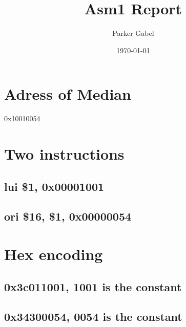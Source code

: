 \documentclass[11pt]{article}
\author{Parker Gabel}
\date{\today}
\title{Asm1 Report}
\begin{document}
\maketitle

\section{Adress of Median}
\label{sec:orgc600dbe}
0x10010054
\section{Two instructions}
\label{sec:orgb352cd8}
\subsection{lui \$1, 0x00001001}
\label{sec:orgc102f80}
\subsection{ori \$16, \$1, 0x00000054}
\label{sec:org4db6459}
\section{Hex encoding}
\label{sec:org851f2cf}
\subsection{0x3c011001, 1001 is the constant}
\label{sec:org54386ab}
\subsection{0x34300054, 0054 is the constant}
\label{sec:org991be22}
\end{document}
